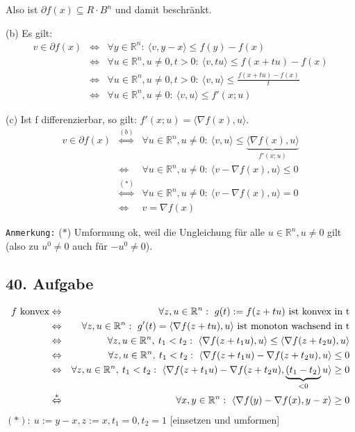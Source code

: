 \documentclass[a4paper,11pt,twoside,titlepage]{article}
\newcommand{\R}{{\mathbb R}}
\begin{document}
Also ist $\partial f(x)\subseteq R\cdot B^n$ und damit beschränkt.

(b) Es gilt:
\begin{eqnarray*}
v\in\partial f(x)&\Leftrightarrow&\forall y\in\R^n:\ \langle v,y-x\rangle\leq f(y)-f(x)\\
&\Leftrightarrow&\forall u\in\R^n,u\neq0,t>0:\ \langle v,tu\rangle\leq f(x+tu)-f(x)\\
&\Leftrightarrow&\forall u\in\R^n,u\neq0,t>0:\ \langle v,u\rangle\leq \frac{f(x+tu)-f(x)}{t}\\
&\Leftrightarrow&\forall u\in\R^n,u\neq0:\ \langle v,u\rangle\leq f'(x;u)
\end{eqnarray*}

(c) Ist f differenzierbar, so gilt: $f'(x;u)=\langle\nabla f(x),u\rangle$.
\begin{eqnarray*}
v\in\partial f(x)&\stackrel{(b)}{\Leftrightarrow}&\forall u\in\R^n,u\neq0:\ \langle v,u\rangle\leq \underbrace{\langle\nabla f(x),u\rangle}_{f'(x;u)}\\
&\Leftrightarrow&\forall u\in\R^n,u\neq0:\ \langle v-\nabla f(x),u\rangle\leq 0\\
&\stackrel{(\ast)}{\Leftrightarrow}&\forall u\in\R^n,u\neq0:\ \langle v-\nabla f(x),u\rangle=0\\
&\Leftrightarrow& v=\nabla f(x)
\end{eqnarray*}

\texttt{Anmerkung:} ($\ast$) Umformung ok, weil die Ungleichung für alle $u\in\R^n, u\neq 0$ gilt (also zu $u^0\neq0$ auch für $-u^0\neq0$).

\subsection*{40. Aufgabe}
\begin{eqnarray*}
f \textnormal{ konvex}&\Leftrightarrow&\forall z,u\in\R^n:\ g(t):=f(z+tu) \textnormal{ ist konvex in t}\\
&\Leftrightarrow&\forall z,u\in\R^n:\ g'(t)=\langle\nabla f(z+tu),u\rangle \textnormal{ ist monoton wachsend in t}\\
&\Leftrightarrow&\forall z,u\in\R^n,\:t_1<t_2:\ \langle\nabla f(z+t_1u),u\rangle\leq\langle\nabla f(z+t_2u),u\rangle\\
&\Leftrightarrow&\forall z,u\in\R^n,\:t_1<t_2:\ \langle\nabla f(z+t_1u)-\nabla f(z+t_2u),u\rangle\leq0\\
&\Leftrightarrow&\forall z,u\in\R^n,\:t_1<t_2:\ \langle\nabla f(z+t_1u)-\nabla f(z+t_2u),\underbrace{(t_1-t_2)}_{<0}u\rangle\geq0\\
&\stackrel{\ast}{\Leftrightarrow}&\forall x,y\in\R^n:\ \langle\nabla f(y)-\nabla f(x),y-x\rangle\geq0
\end{eqnarray*}
$(\ast):\ u:=y-x, z:=x, t_1=0, t_2=1$ [einsetzen und umformen]
\end{document}

